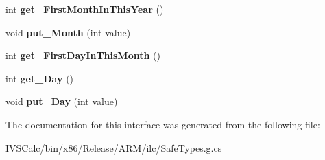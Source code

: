 \begin{DoxyCompactItemize}
int {\bfseries get\+\_\+\+First\+Month\+In\+This\+Year} ()
\item 
\mbox{\label{interface_windows_1_1_globalization_1_1_i_calendar_a32f3397ed35e28352e86f695222e54be}} 
void {\bfseries put\+\_\+\+Month} (int value)
\item 
\mbox{\label{interface_windows_1_1_globalization_1_1_i_calendar_adc19c01797871537da532a15bbf8564d}} 
int {\bfseries get\+\_\+\+First\+Day\+In\+This\+Month} ()
\item 
\mbox{\label{interface_windows_1_1_globalization_1_1_i_calendar_ab007ec8dd6958019ebaf294a10c99754}} 
int {\bfseries get\+\_\+\+Day} ()
\item 
\mbox{\label{interface_windows_1_1_globalization_1_1_i_calendar_a212909fac270f96dc2f6f57c04d5708a}} 
void {\bfseries put\+\_\+\+Day} (int value)
\end{DoxyCompactItemize}


The documentation for this interface was generated from the following file\+:\begin{DoxyCompactItemize}
\item 
I\+V\+S\+Calc/bin/x86/\+Release/\+A\+R\+M/ilc/Safe\+Types.\+g.\+cs\end{DoxyCompactItemize}
